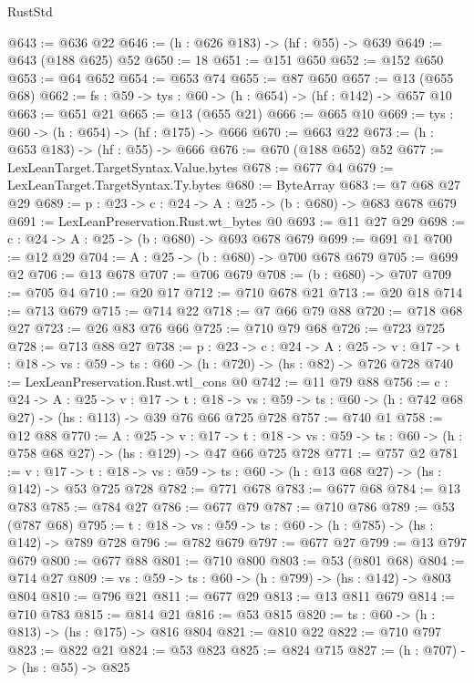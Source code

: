 \begin{lexlean}{RustStd}
\begin{coremodule}
@643 := @636 @22
@646 := (h : @626 @183) -> (hf : @55) -> @639
@649 := @643 (@188 @625) @52
@650 := 18
@651 := @151 @650
@652 := @152 @650
@653 := @64 @652
@654 := @653 @74
@655 := @87 @650
@657 := @13 (@655 @68)
@662 := {fs : @59} -> {tys : @60} -> (h : @654) -> (hf : @142) -> @657 @10
@663 := @651 @21
@665 := @13 (@655 @21)
@666 := @665 @10
@669 := {tys : @60} -> (h : @654) -> (hf : @175) -> @666
@670 := @663 @22
@673 := (h : @653 @183) -> (hf : @55) -> @666
@676 := @670 (@188 @652) @52
@677 := LexLeanTarget.TargetSyntax.Value.bytes
@678 := @677 @4
@679 := LexLeanTarget.TargetSyntax.Ty.bytes
@680 := ByteArray
@683 := @7 @68 @27 @29
@689 := {p : @23} -> {c : @24} -> {A : @25} -> (b : @680) -> @683 @678 @679
@691 := LexLeanPreservation.Rust.wt_bytes @0
@693 := @11 @27 @29
@698 := {c : @24} -> {A : @25} -> (b : @680) -> @693 @678 @679
@699 := @691 @1
@700 := @12 @29
@704 := {A : @25} -> (b : @680) -> @700 @678 @679
@705 := @699 @2
@706 := @13 @678
@707 := @706 @679
@708 := (b : @680) -> @707
@709 := @705 @4
@710 := @20 @17
@712 := @710 @678 @21
@713 := @20 @18
@714 := @713 @679
@715 := @714 @22
@718 := @7 @66 @79 @88
@720 := @718 @68 @27
@723 := @26 @83 @76 @66
@725 := @710 @79 @68
@726 := @723 @725
@728 := @713 @88 @27
@738 := {p : @23} ->
  {c : @24} ->
  {A : @25} ->
  {v : @17} -> {t : @18} -> {vs : @59} -> {ts : @60} -> (h : @720) -> (hs : @82) -> @726 @728
@740 := LexLeanPreservation.Rust.wtl_cons @0
@742 := @11 @79 @88
@756 := {c : @24} ->
  {A : @25} ->
  {v : @17} ->
  {t : @18} ->
  {vs : @59} -> {ts : @60} -> (h : @742 @68 @27) -> (hs : @113) -> @39 @76 @66 @725 @728
@757 := @740 @1
@758 := @12 @88
@770 := {A : @25} ->
  {v : @17} ->
  {t : @18} -> {vs : @59} -> {ts : @60} -> (h : @758 @68 @27) -> (hs : @129) -> @47 @66 @725 @728
@771 := @757 @2
@781 := {v : @17} ->
  {t : @18} -> {vs : @59} -> {ts : @60} -> (h : @13 @68 @27) -> (hs : @142) -> @53 @725 @728
@782 := @771 @678
@783 := @677 @68
@784 := @13 @783
@785 := @784 @27
@786 := @677 @79
@787 := @710 @786
@789 := @53 (@787 @68)
@795 := {t : @18} -> {vs : @59} -> {ts : @60} -> (h : @785) -> (hs : @142) -> @789 @728
@796 := @782 @679
@797 := @677 @27
@799 := @13 @797 @679
@800 := @677 @88
@801 := @710 @800
@803 := @53 (@801 @68)
@804 := @714 @27
@809 := {vs : @59} -> {ts : @60} -> (h : @799) -> (hs : @142) -> @803 @804
@810 := @796 @21
@811 := @677 @29
@813 := @13 @811 @679
@814 := @710 @783
@815 := @814 @21
@816 := @53 @815
@820 := {ts : @60} -> (h : @813) -> (hs : @175) -> @816 @804
@821 := @810 @22
@822 := @710 @797
@823 := @822 @21
@824 := @53 @823
@825 := @824 @715
@827 := (h : @707) -> (hs : @55) -> @825

\end{coremodule}
\end{lexlean}
